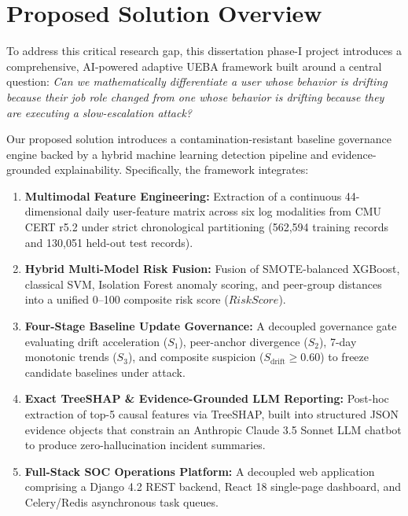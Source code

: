 \documentclass[12pt,a4paper]{report}
\begin{document}
\section{Proposed Solution Overview}
To address this critical research gap, this dissertation phase-I project introduces a comprehensive, AI-powered adaptive UEBA framework built around a central question: \textit{Can we mathematically differentiate a user whose behavior is drifting because their job role changed from one whose behavior is drifting because they are executing a slow-escalation attack?}

Our proposed solution introduces a contamination-resistant baseline governance engine backed by a hybrid machine learning detection pipeline and evidence-grounded explainability. Specifically, the framework integrates:
\begin{enumerate}
    \item \textbf{Multimodal Feature Engineering:} Extraction of a continuous 44-dimensional daily user-feature matrix across six log modalities from CMU CERT r5.2 under strict chronological partitioning (562,594 training records and 130,051 held-out test records).
    \item \textbf{Hybrid Multi-Model Risk Fusion:} Fusion of SMOTE-balanced XGBoost, classical SVM, Isolation Forest anomaly scoring, and peer-group distances into a unified 0--100 composite risk score ($RiskScore$).
    \item \textbf{Four-Stage Baseline Update Governance:} A decoupled governance gate evaluating drift acceleration ($S_1$), peer-anchor divergence ($S_2$), 7-day monotonic trends ($S_3$), and composite suspicion ($S_{\text{drift}} \ge 0.60$) to freeze candidate baselines under attack.
    \item \textbf{Exact TreeSHAP \& Evidence-Grounded LLM Reporting:} Post-hoc extraction of top-5 causal features via TreeSHAP, built into structured JSON evidence objects that constrain an Anthropic Claude 3.5 Sonnet LLM chatbot to produce zero-hallucination incident summaries.
    \item \textbf{Full-Stack SOC Operations Platform:} A decoupled web application comprising a Django 4.2 REST backend, React 18 single-page dashboard, and Celery/Redis asynchronous task queues.
\end{enumerate}
\end{document}
